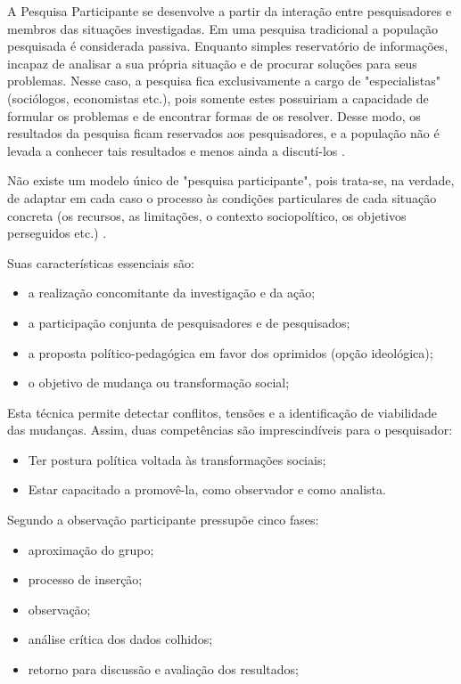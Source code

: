 A Pesquisa Participante se desenvolve a partir da interação entre pesquisadores e membros das situações investigadas. Em uma pesquisa tradicional a população pesquisada é considerada passiva. Enquanto simples reservatório de informações, incapaz de analisar a sua própria situação e de procurar soluções para seus problemas. Nesse  caso, a pesquisa fica exclusivamente a cargo de "especialistas" (sociólogos, economistas etc.), pois somente estes possuiriam a capacidade de formular os problemas e de encontrar formas de os resolver. Desse modo, os resultados da pesquisa ficam reservados aos pesquisadores, e a  população não é levada a conhecer tais resultados e menos ainda a discutí-los \cite{leBoterf}.

Não existe um modelo único de "pesquisa participante", pois trata-se, na verdade, de adaptar em cada caso o processo às condições particulares de cada situação concreta (os recursos, as limitações, o contexto sociopolítico, os objetivos perseguidos etc.) \cite{leBoterf}.

Suas características essenciais são:

\begin{itemize}
	\item a realização concomitante da investigação e da ação;
	\item a participação conjunta de pesquisadores e de pesquisados;
	\item a proposta político-pedagógica em favor dos oprimidos (opção ideológica);
	\item o objetivo de mudança ou transformação social;
\end{itemize}

Esta técnica permite detectar conflitos, tensões e a identificação de viabilidade das mudanças. Assim, duas competências são imprescindíveis para o pesquisador:

\begin{itemize}
	\item Ter postura política voltada às transformações sociais; 
	\item Estar capacitado a promovê-la, como observador e como analista.
\end{itemize}

Segundo \cite{costaSantosTrevisan} a observação participante pressupõe cinco fases:

\begin{itemize}
	\item aproximação do grupo;
	\item processo de inserção;
	\item observação;
	\item análise crítica dos dados colhidos;
	\item retorno para discussão e avaliação dos resultados;
\end{itemize}

